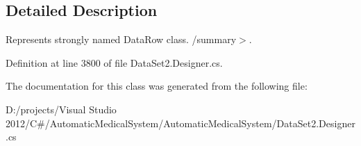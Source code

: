 \subsection{Detailed Description}
Represents strongly named DataRow class. /summary$>$. 

Definition at line 3800 of file DataSet2.Designer.cs.

The documentation for this class was generated from the following file:\begin{CompactItemize}
\item 
D:/projects/Visual Studio 2012/C\#/AutomaticMedicalSystem/AutomaticMedicalSystem/DataSet2.Designer.cs\end{CompactItemize}
